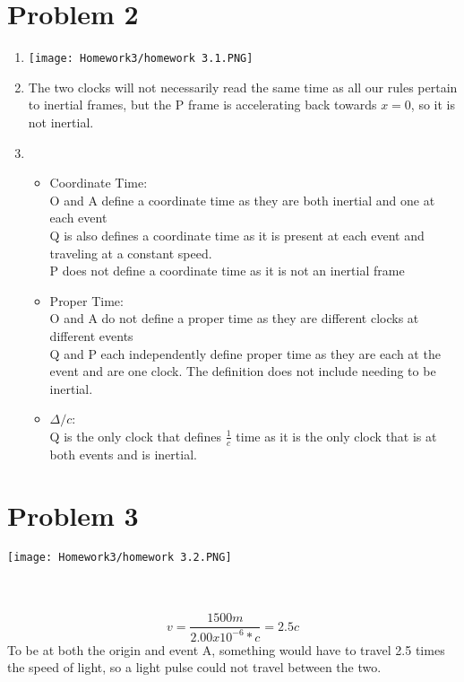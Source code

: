 \documentclass[11pt]{article}
\begin{document}
\section*{Problem 2}
\begin{enumerate}[label=\alph*)]
    \item 
    
    \parbox{}{ \texttt{[image: Homework3/homework 3.1.PNG]}}
    
\item
The two clocks will not necessarily read the same time as all our rules pertain to inertial frames, but the P frame is accelerating back towards $x=0$, so it is not inertial.

\item
\begin{itemize}
    \item Coordinate Time:\\
        O and A define a coordinate time as they are both inertial and one at each event\\
        Q is also defines a coordinate time as it is present at each event and traveling at a constant speed.\\
        P does not define a coordinate time as it is not an inertial frame
    \item Proper Time:\\
        O and A do not define a proper time as they are different clocks at different events\\
        Q and P each independently define proper time as they are each at the event and are one clock. The definition does not include needing to be inertial.
    \item $\Delta  /c$:\\
        Q is the only clock that defines $\frac{1}{c}$ time as it is the only clock that is at both events and is inertial.
\end{itemize}
\end{enumerate}

\section*{Problem 3}
    \parbox{}{ \texttt{[image: Homework3/homework 3.2.PNG]}}\\\\
    \[v = \frac{1500m}{2.00x10^{-6}*c} = 2.5c\]
    To be at both the origin and event A, something would have to travel 2.5 times the speed of light, so a light pulse could not travel between the two.
\end{document}
